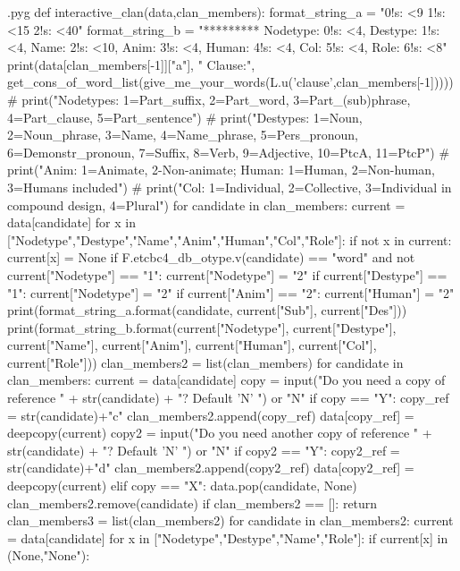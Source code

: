 \documentclass{report}
\makeatletter
\newenvironment{python}{%
  \VerbatimEnvironment
  \minted@resetoptions
  \setkeys{minted@opt}{}
      \begin{VerbatimOut}{\jobname.pyg}}
{%
      \end{VerbatimOut}
      \minted@pygmentize{python}
      \DeleteFile{\jobname.pyg}}
\makeatother
\begin{document}
\begin{python}
def interactive_clan(data,clan_members):
    format_string_a = "{0!s: <9} {1!s: <15} {2!s: <40}"
    format_string_b = "********* Nodetype: {0!s: <4}, Destype: {1!s: <4}, Name: {2!s: <10}, Anim: {3!s: <4}, Human: {4!s: <4}, Col: {5!s: <4}, Role: {6!s: <8}"
    print(data[clan_members[-1]]["a"], " Clause:", get_cons_of_word_list(give_me_your_words(L.u('clause',clan_members[-1]))))
#    print("Nodetypes: 1=Part_suffix, 2=Part_word, 3=Part_(sub)phrase, 4=Part_clause, 5=Part_sentence")
#    print("Destypes: 1=Noun, 2=Noun_phrase, 3=Name, 4=Name_phrase, 5=Pers_pronoun, 6=Demonstr_pronoun, 7=Suffix, 8=Verb, 9=Adjective, 10=PtcA, 11=PtcP")
#    print("Anim: 1=Animate, 2-Non-animate; Human: 1=Human, 2=Non-human, 3=Humans included")
#    print("Col: 1=Individual, 2=Collective, 3=Individual in compound design, 4=Plural")
    for candidate in clan_members:
        current = data[candidate]
        for x in ["Nodetype","Destype","Name","Anim","Human","Col","Role"]:
            if not x in current:
                current[x] = None
        if F.etcbc4_db_otype.v(candidate) == "word" and not current["Nodetype"] == "1":
            current["Nodetype"] = "2"
        if current["Destype"] == "1":
            current["Nodetype"] = "2"
        if current["Anim"] == "2":
            current["Human"] = "2"
        print(format_string_a.format(candidate, current["Sub"], current["Des"]))
        print(format_string_b.format(current["Nodetype"], current["Destype"], current["Name"], current["Anim"], current["Human"], current["Col"], current["Role"]))
    clan_members2 = list(clan_members)
    for candidate in clan_members:
        current = data[candidate]
        copy = input("Do you need a copy of reference " + str(candidate) + "? Default 'N' ") or "N"
        if copy == "Y":
            copy_ref = str(candidate)+"c"
            clan_members2.append(copy_ref)
            data[copy_ref] = deepcopy(current)
            copy2 = input("Do you need another copy of reference " + str(candidate) + "? Default 'N' ") or "N"
            if copy2 == "Y":
                copy2_ref = str(candidate)+"d"
                clan_members2.append(copy2_ref)
                data[copy2_ref] = deepcopy(current)
        elif copy == "X":
            data.pop(candidate, None)
            clan_members2.remove(candidate)
            if clan_members2 == []:
                return
    clan_members3 = list(clan_members2)
    for candidate in clan_members2:
        current = data[candidate]
        for x in ["Nodetype","Destype","Name","Role"]:
            if current[x] in (None,"None"):

\end{python}
\end{document}
